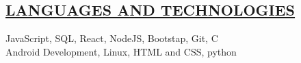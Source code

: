 \documentclass[10pt]{res} %
\begin{document}
\begin{resume}
\section{\underline{LANGUAGES AND TECHNOLOGIES}}
\vspace{4pt}
  	JavaScript, SQL, React, NodeJS, Bootstap, Git, C\\
  	Android Development, Linux, HTML and CSS, python
  	
\end{resume}
\end{document}
